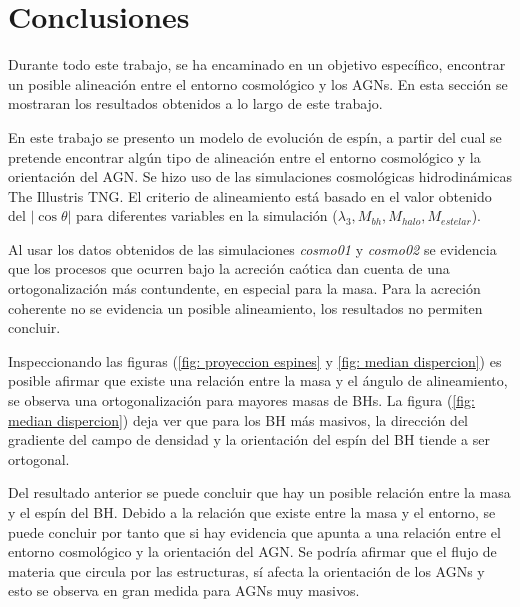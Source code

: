 \newpage
\section{Conclusiones}
\label{sec: conclusiones}
Durante todo este trabajo, se ha encaminado en un objetivo específico, encontrar un posible alineación entre el entorno cosmológico y los AGNs. En esta sección se mostraran los resultados obtenidos a lo largo de este trabajo.


En este trabajo se presento un modelo de evolución de espín, a partir del cual se pretende encontrar algún tipo de alineación entre el entorno cosmológico y la orientación del AGN. Se hizo uso de las simulaciones cosmológicas hidrodinámicas The Illustris TNG. El criterio de alineamiento está basado en el valor obtenido del $|\cos \theta|$ para diferentes variables en la simulación ($\lambda_{3}, M_{bh}, M_{halo}, M_{estelar}$). 

Al usar los datos obtenidos de las simulaciones {\it{cosmo01}} y {\it{cosmo02}} se evidencia que los procesos que ocurren bajo la acreción caótica dan cuenta de una ortogonalización más contundente, en especial para la masa. Para la acreción coherente no se evidencia un posible alineamiento, los resultados no permiten concluir. 

Inspeccionando las figuras (\ref{fig: proyeccion espines} y \ref{fig: median dispercion}) es posible afirmar que existe una relación entre la masa y el ángulo de alineamiento, se observa una ortogonalización  para mayores masas de BHs. La figura (\ref{fig: median dispercion}) deja ver que para los BH más masivos, la dirección del gradiente del campo de densidad y la orientación del espín del BH tiende a ser ortogonal. 

Del resultado anterior se puede concluir que hay un posible relación entre la masa y el espín del BH. Debido a la relación que existe entre la masa y el entorno, se puede concluir por tanto que si hay evidencia que apunta a una relación entre el entorno cosmológico y la orientación del AGN. Se podría afirmar que el flujo de materia que circula por las estructuras, sí afecta la orientación de los AGNs y esto se observa en gran medida para AGNs muy masivos.





